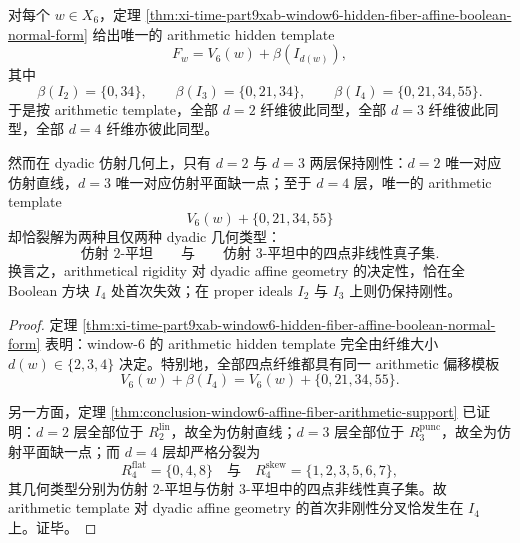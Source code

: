 \begin{theorem}\label{thm:conclusion-window6-arithmetic-template-dyadic-bifurcation}
对每个 \(w\in X_6\)，定理 \ref{thm:xi-time-part9xab-window6-hidden-fiber-affine-boolean-normal-form} 给出唯一的 arithmetic hidden template
\[
F_w=V_6(w)+\beta(I_{d(w)}),
\]
其中
\[
\beta(I_2)=\{0,34\},\qquad
\beta(I_3)=\{0,21,34\},\qquad
\beta(I_4)=\{0,21,34,55\}.
\]
于是按 arithmetic template，全部 \(d=2\) 纤维彼此同型，全部 \(d=3\) 纤维彼此同型，全部 \(d=4\) 纤维亦彼此同型。

然而在 dyadic 仿射几何上，只有 \(d=2\) 与 \(d=3\) 两层保持刚性：\(d=2\) 唯一对应仿射直线，\(d=3\) 唯一对应仿射平面缺一点；至于 \(d=4\) 层，唯一的 arithmetic template
\[
V_6(w)+\{0,21,34,55\}
\]
却恰裂解为两种且仅两种 dyadic 几何类型：
\[
\text{仿射 }2\text{-平坦}
\qquad\text{与}\qquad
\text{仿射 }3\text{-平坦中的四点非线性真子集}.
\]
换言之，arithmetical rigidity 对 dyadic affine geometry 的决定性，恰在全 Boolean 方块 \(I_4\) 处首次失效；在 proper ideals \(I_2\) 与 \(I_3\) 上则仍保持刚性。
\end{theorem}
\begin{proof}
定理 \ref{thm:xi-time-part9xab-window6-hidden-fiber-affine-boolean-normal-form} 表明：window-\(6\) 的 arithmetic hidden template 完全由纤维大小 \(d(w)\in\{2,3,4\}\) 决定。特别地，全部四点纤维都具有同一 arithmetic 偏移模板
\[
V_6(w)+\beta(I_4)=V_6(w)+\{0,21,34,55\}.
\]

另一方面，定理 \ref{thm:conclusion-window6-affine-fiber-arithmetic-support} 已证明：\(d=2\) 层全部位于 \(R_{2}^{\mathrm{lin}}\)，故全为仿射直线；\(d=3\) 层全部位于 \(R_{3}^{\mathrm{punc}}\)，故全为仿射平面缺一点；而 \(d=4\) 层却严格分裂为
\[
R_{4}^{\mathrm{flat}}=\{0,4,8\}
\quad\text{与}\quad
R_{4}^{\mathrm{skew}}=\{1,2,3,5,6,7\},
\]
其几何类型分别为仿射 \(2\)-平坦与仿射 \(3\)-平坦中的四点非线性真子集。故 arithmetic template 对 dyadic affine geometry 的首次非刚性分叉恰发生在 \(I_4\) 上。证毕。
\end{proof}

